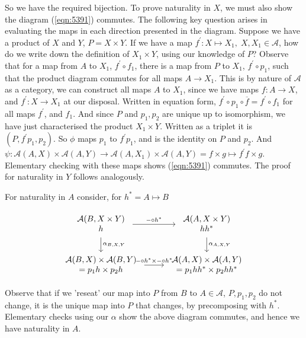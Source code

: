 \documentclass{article}
\begin{document}
So we have the required bijection. To prove naturality in $X$, we must also show the diagram (\ref{eqn:5391}) commutes. The following key question arises in evaluating the maps in each direction presented in the diagram. Suppose we have a product of $X$ and $Y$, $P = X \times Y$. If we have a map $f^\prime: X \mapsto X_1, \; X,X_1 \in \mathcal{A}$, how do we write down the definition of $X_1 \times Y$, using our knowledge of $P$? Observe that for a map from $A$ to $X_1$, $f^\prime \circ f_1$, there is a map from $P$ to $X_1$, $f^\prime \circ p_1$, such that the product diagram commutes for all maps $A \rightarrow X_1$. This is by nature of $\mathcal{A}$ as a category, we can construct all maps $A$ to $X_1$, since we have maps $f \colon A \rightarrow X$, and $f^\prime \colon X \rightarrow X_1$ at our disposal. Written in equation form, $f^\prime \circ p_1 \circ \overline{f} = f^\prime \circ f_1$ for all maps $f^\prime$, and $f_1$. And since $P$ and $p_1, p_2$ are unique up to isomorphism, we have just characterised the product $X_1 \times Y$. Written as a triplet it is $(P, f^\prime p_1, p_2)$. So $\phi$ maps $p_1$ to $f^\prime p_1$, and is the identity on $P$ and $p_2$. And $\psi\colon \mathcal{A}(A,X) \times \mathcal{A}(A,Y) \rightarrow \mathcal{A}(A,X_1) \times \mathcal{A}(A,Y) = f \times g \mapsto f^\prime f \times g$. Elementary checking with these maps shows (\ref{eqn:5391}) commutes. The proof for naturality in $Y$ follows analogously.

For naturality in $A$ consider, for $h^* = A \mapsto B$

\begin{equation}
  \label{eqn:5393}
  \begin{tikzcd}
    \begin{array}{c}
      \mathcal{A}(B, X \times Y) \\
      h
    \end{array}
    \arrow[r, "\mathit{-} \circ h^*"] \arrow[d, "\alpha_{B,X,Y}"]
    &
    \begin{array}{c}
      \mathcal{A}(A, X \times Y) \\
      hh^*
    \end{array}
    \arrow[d, "\alpha_{A,X,Y}"]\\
    \begin{array}{c}
      \mathcal{A}(B,X) \times \mathcal{A}(B,Y) \\
      = p_1h \times p_2h
     \end{array}
    \arrow[r, "\;\mathit{-} \circ h^* \times \mathit{-} \circ h^*\;"]
    &
    \begin{array}{c}
      \mathcal{A}(A,X) \times \mathcal{A}(A,Y) \\
      = p_1hh^* \times p_2hh^*
    \end{array}
  \end{tikzcd}
\end{equation}

Observe that if we 'reseat' our map into $P$ from $B$ to $A \in \mathcal{A}$, $P, p_1, p_2$ do not change, it is the unique map into $P$ that changes, by precomposing with $h^*$. Elementary checks using our $\alpha$ show the above diagram commutes, and hence we have naturality in $A$.
\end{document}
